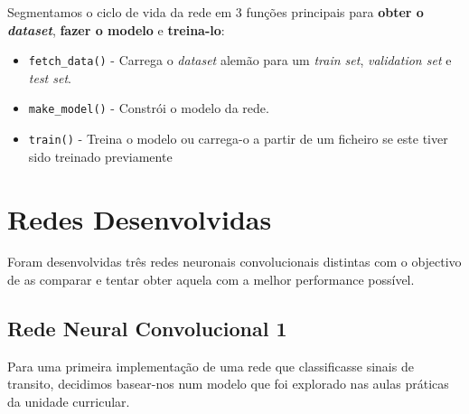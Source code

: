 \documentclass[a4paper]{report}
\begin{document}
Segmentamos o ciclo de vida da rede em 3 funções principais para \textbf{obter o
\textit{dataset}}, \textbf{fazer o modelo} e \textbf{treina-lo}:

\begin{itemize}
    \item \texttt{fetch\_data()} - Carrega o \textit{dataset} alemão para um
    \textit{train set}, \textit{validation set} e \textit{test set}.
    \item \texttt{make\_model()} - Constrói o modelo da rede.
    \item \texttt{train()} - Treina o modelo ou carrega-o a partir de um ficheiro se
    este tiver sido treinado previamente
\end{itemize}

\chapter{Redes Desenvolvidas}

Foram desenvolvidas três redes neuronais convolucionais distintas com o objectivo
de as comparar e tentar obter aquela com a melhor performance possível.

\section{Rede Neural Convolucional 1}

Para uma primeira implementação de uma rede que classificasse sinais de transito,
decidimos basear-nos num modelo que foi explorado nas aulas práticas da unidade
curricular.
\end{document}

